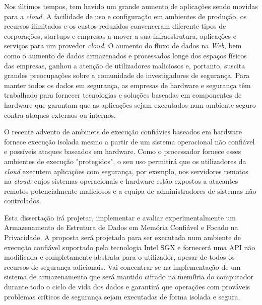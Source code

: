 Nos \'{u}ltimos tempos, tem havido um grande aumento de aplica\c{c}\~{o}es sendo movidas para a \textit{cloud}. A facilidade de uso e configura\c{c}\~{a}o em ambientes de produ\c{c}\~{a}o, os recursos ilimitados e os custos reduzidos convenceram diferente tipos de corpora\c{c}\~{o}es, startups e empresas a mover a sua infraestrutura, aplica\c{c}\~{o}es e servi\c{c}os para um provedor \textit{cloud}. O aumento do fluxo de dados na \textit{Web}, bem como o aumento de dados armazenados e processados longe dos espaços f\'{i}sicos das empresas, ganhou a aten\c{c}\~{a}o de utilizadores maliciosos e, portanto, suscita grandes preocupa\c{c}\~{o}es sobre a comunidade de investigadores de seguran\c{c}a. Para manter todos os dados em seguran\c{c}a, as empresas de hardware e seguran\c{c}a têm trabalhado para fornecer tecnologias e solu\c{c}\~{o}es baseadas em componentes de hardware que garantam que as aplica\c{c}\~{o}es sejam executados num ambiente seguro contra ataques externos ou internos.

O recente advento de ambinets de execu\c{c}\~{a}o confi\'{a}vies baseados em hardware fornece execu\c{c}\~{a}o isolada mesmo a partir de um sistema operacional não confi\'{a}vel e poss\'{i}veis ataques baseados em hardware. Como o processador fornece esses ambientes de execu\c{c}\~{a}o "protegidos", o seu uso permitir\'{a} que os utilizadores da \textit{cloud} executem aplica\c{c}\~{o}es com segurança, por exemplo, nos servidores remotos na \textit{cloud}, cujos sistemas operacionais e hardware est\~{a}o expostos a atacantes remotos potencialmente maliciosos e a equipa de administradores de sistemas n\~{a}o controlados.

Esta disserta\c{c}\~{a}o ir\'{a} projetar, implementar e avaliar experimentalmente um Armazenamento de Estrutura de Dados em Mem\'{o}ria Confi\'{a}vel e Focado na Privacidade. A proposta ser\'{a} projetada para ser executada num ambiente de execu\c{c}\~{a}o confi\'{a}vel suportado pela tecnologia Intel SGX e fornecer\'{a} uma API não modificada e completamente abstrata para o utilizador, apesar de todos os recursos de segurança adicionais. Vai concentrar-se na implementa\c{c}\~{a}o de um sistema de armazenamento que ser\'{a} mantido cifrado na mem\'{0}ria do computador durante todo o ciclo de vida dos dados e garantir\'{a} que opera\c{c}\~{o}es com prov\'{a}veis problemas cr\'{i}ticos de seguran\c{c}a sejam executadas de forma isolada e segura.


